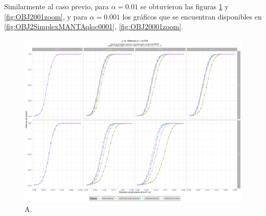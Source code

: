 \documentclass[IB,BIB]{TFUOC}%
\begin{document}
Similarmente al caso previo, para \( \alpha = \text{0.01} \) se obtuvieron las figuras \ref{fig:OBJ2SimplexMANTAqloc001} y \ref{fig:OBJ2001zoom}, y para \( \alpha = \text{0.001} \) los gráficos que se encuentran disponibles en \ref{fig:OBJ2SimplexMANTAqloc0001}, \ref{fig:OBJ20001zoom}.

\begin{figure}[!htbp]
\hspace*{-0.8cm} %
    \centering
    \includegraphics[scale=.45]{OBJ2SimplexMANTAqloc001.pdf}
    \caption{\scriptsize{A.}}
    \label{fig:OBJ2SimplexMANTAqloc001}
\end{figure}
\end{document}
